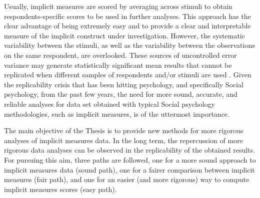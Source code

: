 \documentclass[12pt]{book}
\begin{document}
Usually, implicit measures are scored by averaging across stimuli to obtain respondents-specific scores to be used in further analyses. 
This approach has the clear advantage of being extremely easy and to provide a clear and interpretable measure of the implicit construct under investigation.  
However, the systematic variability between the stimuli, as well as the variability between the observations on the same respondent, are overlooked. 
These sources of uncontrolled error variance may generate statistically significant mean results that cannot be replicated when different samples of respondents and/or stimuli are used \cite{judd2012}. 
Given the replicability crisis that has been hitting psychology, and specifically Social psychology, from the past few years, the need for more sound, accurate, and reliable analyses for data set obtained with typical Social psychology methodologies, such as implicit measures, is of the uttermost importance. 

The main objective of the Thesis is to provide new methods for more rigorous analyses of implicit measures data. 
In the long term, the repercussion of more rigorous data analyses can be observed in the replicability of the obtained results.
For pursuing this aim, three paths are followed, one for a more sound approach to implicit measures data (sound path), one for a fairer comparison between implicit measures (fair path), and one for an easier (and more rigorous) way to compute implicit measures scores (easy path).
\end{document}
